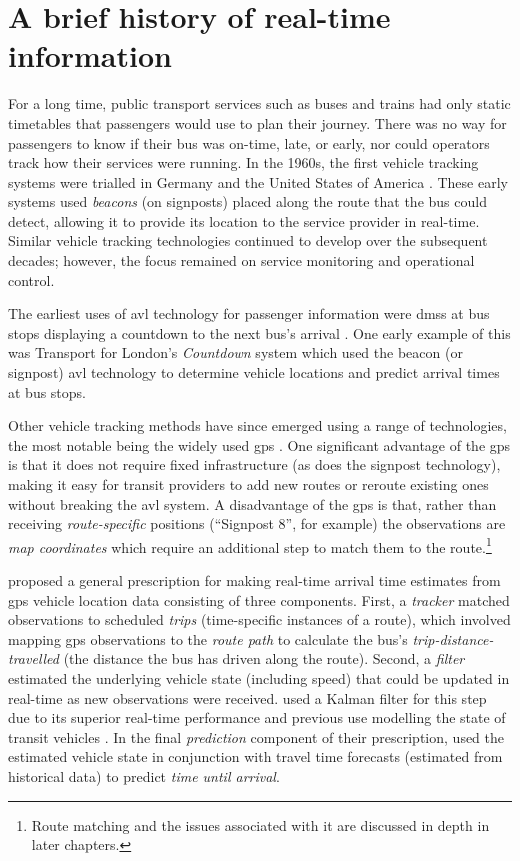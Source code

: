\section{A brief history of real-time information}
\label{sec:literature}

For a long time, public transport services such as buses and trains had only static timetables that passengers would use to plan their journey. There was no way for passengers to know if their bus was on-time, late, or early, nor could operators track how their services were running. In the 1960s, the first vehicle tracking systems were trialled in Germany and the United States of America \citep{TCRP_1997}. These early systems used \emph{beacons} (on signposts) placed along the route that the bus could detect, allowing it to provide its location to the service provider in real-time. Similar vehicle tracking technologies continued to develop over the subsequent decades; however, the focus remained on service monitoring and operational control.


The earliest uses of \gls{avl} technology for passenger information were \glspl{dms} at bus stops displaying a countdown to the next bus's arrival \citep{TCRP_2003}. One early example of this was Transport for London's \emph{Countdown} system \citep{Balogh_1993} which used the beacon (or signpost) \gls{avl} technology to determine vehicle locations and predict arrival times at bus stops.


Other vehicle tracking methods have since emerged using a range of technologies, the most notable being the widely used \gls{gps} \citep{Zhao_1997}. One significant advantage of the \gls{gps} is that it does not require fixed infrastructure (as does the signpost technology), making it easy for transit providers to add new routes or reroute existing ones without breaking the \gls{avl} system. A disadvantage of the \gls{gps} is that, rather than receiving \emph{route-specific} positions (``Signpost 8'', for example) the observations are \emph{map coordinates} which require an additional step to match them to the route.\footnote{Route matching and the issues associated with it are discussed in depth in later chapters.}


\citet{Cathey_2003} proposed a general prescription for making real-time arrival time estimates from \gls{gps} vehicle location data consisting of three components. First, a \emph{tracker} matched observations to scheduled \emph{trips} (time-specific instances of a route), which involved mapping \gls{gps} observations to the \emph{route path} to calculate the bus's \emph{trip-distance-travelled} (the distance the bus has driven along the route). Second, a \emph{filter} estimated the underlying vehicle state (including speed) that could be updated in real-time as new observations were received.  used a Kalman filter for this step due to its superior real-time performance and previous use modelling the state of transit vehicles \citep{Wall_1999, Dailey_2001}. In the final \emph{prediction} component of their prescription, \citeauthor{Cathey_2003} used the estimated vehicle state in conjunction with travel time forecasts (estimated from historical data) to predict \emph{time until arrival}.


